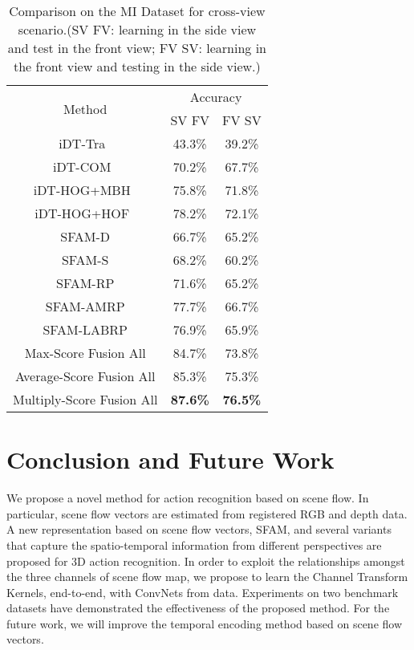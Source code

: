 \documentclass[10pt,twocolumn,letterpaper]{article}
\begin{document}
\begin{table}[!ht]
\centering
\begin{tabular}{|c|c|c|} \hline 
\multirow{2}{*}{Method} 
& \multicolumn{2}{c|}{Accuracy}\\
 \cline{2-3}   
 & SV  FV  & FV  SV  \\ \hline
   iDT-Tra~\cite{liu2016benchmarking} & 43.3\%  & 39.2\% \\ \hline
   iDT-COM~\cite{liu2016benchmarking} & 70.2\%  & 67.7\% \\ \hline
   iDT-HOG+MBH~\cite{liu2016benchmarking} & 75.8\%  & 71.8\% \\ \hline
   iDT-HOG+HOF~\cite{liu2016benchmarking} & 78.2\%  & 72.1\% \\ \hline\hline
   SFAM-D & 66.7\%  & 65.2\% \\ \hline
   SFAM-S & 68.2\%  & 60.2\% \\ \hline
   SFAM-RP & 71.6\%  & 65.2\% \\ \hline
   SFAM-AMRP & 77.7\%  & 66.7\% \\ \hline
   SFAM-LABRP & 76.9\%  & 65.9\% \\ \hline
   Max-Score Fusion All & 84.7\%  & 73.8\% \\ \hline
   Average-Score Fusion All & 85.3\%  & 75.3\% \\ \hline
   Multiply-Score Fusion All & \textbf{87.6\%}  & \textbf{76.5\%} \\ \hline
\end{tabular}
\caption{Comparison on the MI Dataset 
for cross-view scenario.(SV  FV: learning in the side view and 
test in the front view; FV  SV: learning in the front view and 
testing in the side view.) \label{table3}}
\end{table}




\section{Conclusion and Future Work}\label{conclusion}
We propose a novel method for action recognition based on scene flow. 
In particular, scene flow vectors are estimated from registered RGB and depth 
data. A new representation based on scene flow vectors, SFAM, and several 
variants that capture the spatio-temporal information from different 
perspectives are proposed for 3D action recognition. In order to exploit the 
relationships amongst the three channels of scene flow map, we propose to learn 
the Channel Transform Kernels, end-to-end, with  ConvNets from data. 
Experiments on two benchmark datasets have demonstrated the effectiveness of the 
proposed method. For the future work, we will improve the temporal encoding 
method based on scene flow vectors. 
\end{document}
